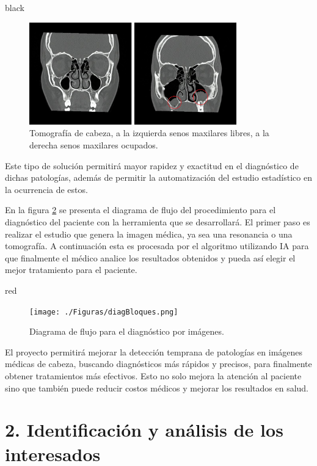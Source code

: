 \documentclass[
11pt, %
]{charter}
\begin{document}
\begin{consigna}{black}
	\begin{figure}[htpb]
		\centering 
		\includegraphics[width=0.8\textwidth]{./Figuras/anomalies.png}
		\caption {Tomografía de cabeza, a la izquierda senos maxilares libres, a la derecha senos maxilares ocupados.}
		\label{fig:anomalies}
		\end{figure}
\end{consigna}

Este tipo de solución permitirá mayor rapidez y exactitud en el diagnóstico de dichas patologías, 
además de permitir la automatización del estudio estadístico en la ocurrencia de estos.

En la figura \ref{fig:diagBloques} se presenta el diagrama de flujo del procedimiento para el 
diagnóstico del paciente con la herramienta que se desarrollará. El primer paso es realizar el
estudio que genera la imagen médica, ya sea una resonancia o una tomografía. A continuación esta 
es procesada por el algoritmo utilizando IA para que finalmente el médico analice los resultados 
obtenidos y pueda así elegir el mejor tratamiento para el paciente.

\begin{consigna}{red}

\begin{figure}[hp]
\centering 
\texttt{[image: ./Figuras/diagBloques.png]}
\caption{Diagrama de flujo para el diagnóstico por imágenes.}
\label{fig:diagBloques}
\end{figure}
\end{consigna}

El proyecto permitirá mejorar la detección temprana de patologías en imágenes médicas de cabeza, 
buscando diagnósticos más rápidos y precisos, para finalmente obtener tratamientos más efectivos. 
Esto no solo mejora la atención al paciente sino que también puede reducir costos médicos 
y mejorar los resultados en salud.


\section{2. Identificación y análisis de los interesados}
\label{sec:interesados}
\end{document}
